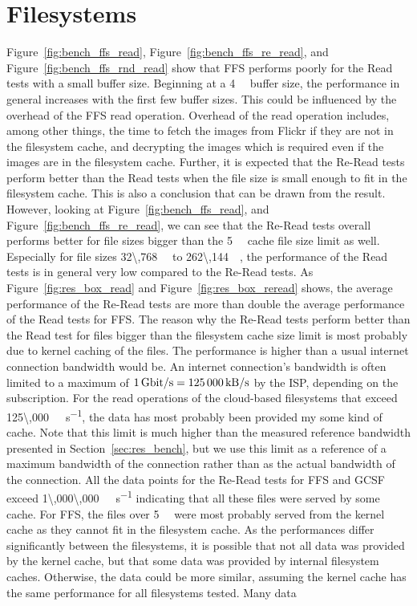 \section{Filesystems}
\label{sec:dis_fs}
Figure~\ref{fig:bench_ffs_read}, Figure~\ref{fig:bench_ffs_re_read}, and Figure~\ref{fig:bench_ffs_rnd_read} show that \gls{FFS} performs poorly for the Read tests with a small buffer size. Beginning at a \SI{4}{\kilo\byte} buffer size, the performance in general increases with the first few buffer sizes. This could be influenced by the overhead of the \gls{FFS} read operation. Overhead of the read operation includes, among other things, the time to fetch the images from Flickr if they are not in the filesystem cache, and decrypting the images which is required even if the images are in the filesystem cache. Further, it is expected that the \mbox{Re-Read} tests perform better than the Read tests when the file size is small enough to fit in the filesystem cache. This is also a conclusion that can be drawn from the result. However, looking at Figure~\ref{fig:bench_ffs_read}, and Figure~\ref{fig:bench_ffs_re_read}, we can see that the \mbox{Re-Read} tests overall performs better for file sizes bigger than the \SI{5}{\mega\byte} cache file size limit as well. Especially for file sizes \SI{32\,768}{\kilo\byte} to \SI{262\,144}{\kilo\byte}, the performance of the Read tests is in general very low compared to the \mbox{Re-Read} tests. As Figure~\ref{fig:res_box_read} and Figure~\ref{fig:res_box_reread} shows, the average performance of the \mbox{Re-Read} tests are more than double the average performance of the Read tests for \gls{FFS}. The reason why the \mbox{Re-Read} tests perform better than the Read test for files bigger than the filesystem cache size limit is most probably due to kernel caching of the files. The performance is higher than a usual internet connection bandwidth would be. An internet connection's bandwidth is often limited to a maximum of $\text{\SI[per-mode = symbol]{1}{\giga\bit\per\second}} = \text{\SI[per-mode = symbol]{125\,000}{\kilo\byte\per\second}}$ by the ISP, depending on the subscription. For the read operations of the \mbox{cloud-based} filesystems that exceed \SI[per-mode = symbol]{125\,000}{\kilo\byte\per\second}, the data has most probably been provided my some kind of cache. Note that this limit is much higher than the measured reference bandwidth presented in Section~\ref{sec:res_bench}, but we use this limit as a reference of a maximum bandwidth of the connection rather than as the actual bandwidth of the connection. All the data points for the \mbox{Re-Read} tests for \gls{FFS} and \gls{GCSF} exceed \SI[per-mode = symbol]{1\,000\,000}{\kilo\byte\per\second} indicating that all these files were served by some cache. For \gls{FFS}, the files over \SI[per-mode = symbol]{5}{\mega\byte} were most probably served from the kernel cache as they cannot fit in the filesystem cache. As the performances differ significantly between the filesystems, it is possible that not all data was provided by the kernel cache, but that some data was provided by internal filesystem caches. Otherwise, the data could be more similar, assuming the kernel cache has the same performance for all filesystems tested. Many data 